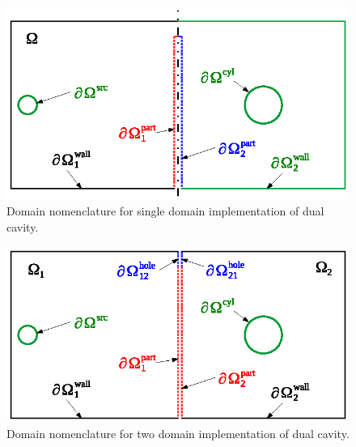 \documentclass[a4paper]{article}
\numberwithin{equation}{section}
\begin{document}
\begin{figure}[ht]
\begin{center}
\includegraphics[width=0.6\linewidth]{figures/domains1}
\vspace{-4mm}
\caption{\label{fg:tcdom1} Domain nomenclature for single domain implementation of dual cavity.}
\end{center}
\end{figure}

\begin{figure}[ht]
\begin{center}
\includegraphics[width=0.6\linewidth]{figures/domains2}
\vspace{-4mm}
\caption{\label{fg:tcdom2} Domain nomenclature for two domain implementation of dual cavity.}
\end{center}
\end{figure}



\end{document}
